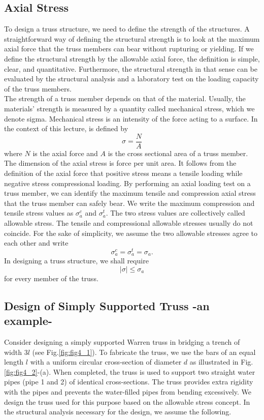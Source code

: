 \documentclass[10pt,a4j]{article}
\begin{document}
\subsection{Axial Stress}
To design a truss structure, we need to define the strength of the structures. A straightforward way of defining the structural strength is to look at the maximum axial force that the truss members can bear without rupturing or yielding. If we define the structural strength by the allowable axial force, the definition is simple, clear, and quantitative. Furthermore, the structural strength in that sense can be evaluated by the structural analysis and a laboratory test on the loading capacity of the truss members.\\ 
The strength of a truss member depends on that of the material. Usually, the materials' strength is measured by a quantity called mechanical stress, which we denote sigma. Mechanical stress is an intensity of the force acting to a surface. In the context of this lecture, is defined by
\begin{equation}
	\sigma=\frac{N}{A}
	\label{eqn:def_sigma}
\end{equation}
where $N$ is the axial force and $A$ is the cross sectional area of a truss member. 
The dimension of the axial stress is force per unit area. It follows from the definition of the axial force that positive stress means a tensile loading while negative stress compressional loading. By performing an axial loading test on a truss member, we can identify the maximum tensile and compression axial stress
that the truss member can safely bear. We write the maximum compression and tensile stress values as $\sigma_{a}^c$ and $\sigma_{a}^t$. The two stress values are collectively called allowable stress.
The tensile and compressional allowable stresses usually do not coincide. For the sake of simplicity, we assume the two allowable stresses agree to each other and write
\begin{equation}
	\sigma_a^c=\sigma_a^t=\sigma_a.
	\label{eqn:sig_a}
\end{equation}
In designing a truss structure, we shall require 
\begin{equation}
	\left| \sigma \right| \leq \sigma_a
	\label{eqn:sig_a_cond}
\end{equation}
for every member of the truss. 
\subsection{Design of Simply Supported Truss -an example-}
Consider designing a simply supported Warren truss in bridging a trench of width 3$l$ (see Fig.\ref{fig:fig4_1}). 
To fabricate the truss, we use the bars of an equal length $l$ with a uniform circular 
cross-section of diameter $d$ as illustrated in Fig.\ref{fig:fig4_2}-(a).
When completed, the truss is used to support two straight water pipes (pipe 1 and 2) 
of identical cross-sections. The truss provides extra rigidity with the pipes and prevents the water-filled pipes from bending excessively. 
We design the truss used for this purpose based on the allowable stress concept. 
In the structural analysis necessary for the design, we assume the following.
\end{document}
